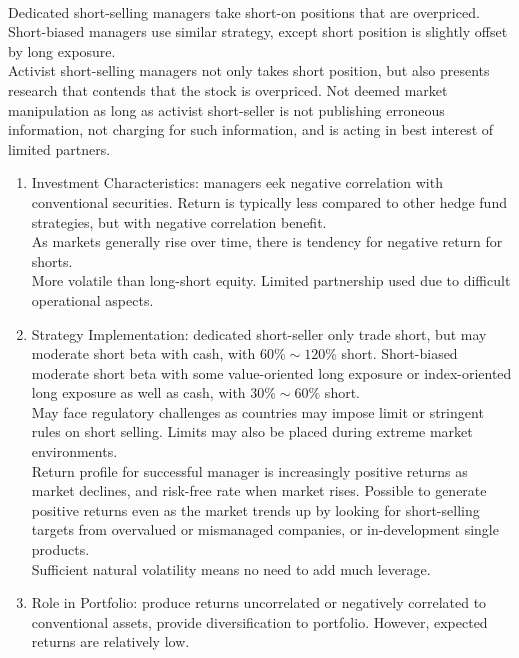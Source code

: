 \begin{remark} \\
Dedicated short-selling managers take short-on positions that are overpriced. Short-biased managers use similar strategy, except short position is slightly offset by long exposure.\\
Activist short-selling managers not only takes short position, but also presents research that contends that the stock is overpriced. Not deemed market manipulation as long as activist short-seller is not publishing erroneous information, not charging for such information, and is acting in best interest of limited partners.
\begin{enumerate}[label=\roman*.]
\setlength{\itemsep}{0pt}
\item Investment Characteristics: managers eek negative correlation with conventional securities. Return is typically less compared to other hedge fund strategies, but with negative correlation benefit.\\
As markets generally rise over time, there is tendency for negative return for shorts.\\
More volatile than long-short equity. Limited partnership used due to difficult operational aspects.
\item Strategy Implementation: dedicated short-seller only trade short, but may moderate short beta with cash, with $60\% \sim 120\%$ short. Short-biased moderate short beta with some value-oriented long exposure or index-oriented long exposure as well as cash, with $30\% \sim 60\%$ short.\\
May face regulatory challenges as countries may impose limit or stringent rules on short selling. Limits may also be placed during extreme market environments.\\
Return profile for successful manager is increasingly positive returns as market declines, and risk-free rate when market rises. Possible to generate positive returns even as the market trends up by looking for short-selling targets from overvalued or mismanaged companies, or in-development single products.\\
Sufficient natural volatility means no need to add much leverage.
\item Role in Portfolio: produce returns uncorrelated or negatively correlated to conventional assets, provide diversification to portfolio. However, expected returns are relatively low.
\end{enumerate}
\end{remark}

